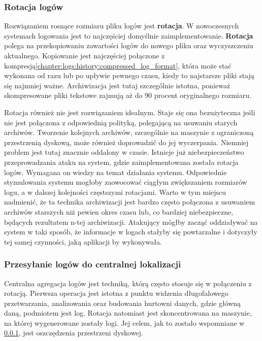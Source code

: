         \subsubsection{Rotacja logów}
        \label{chapter:logs:collecting:rotation}
        Rozwiązaniem rosnące rozmiaru pliku logów jest \textbf{rotacja}. W nowoczesnych systemach logowania
        jest to najczęściej domyślnie zaimplementowanie. \textbf{Rotacja} polega na przekopiowaniu 
        zawartości logów do nowego pliku oraz wyczyszczeniu aktualnego. Kopiowanie jest najczęściej połączone
        z kompresją\ref{chapter:logs:history:compressed_log_format}, która może stać wykonana od razu lub po upływie pewnego czasu, kiedy to najstarsze
        pliki stają się najmniej ważne. Archiwizacja jest tutaj szczególnie istotna, ponieważ
        skompresowane pliki tekstowe zajmują aż do 90 procent oryginalnego rozmiaru.
        
        Rotacja również nie jest rozwiązaniem idealnym. Staje się ona bezużyteczna jeśli nie jest połączona
        z odpowiednią polityką, polegającą na usuwaniu starych archiwów. Tworzenie kolejnych archiwów,
        szczególnie na maszynie z ograniczoną przestrzenią dyskową, może również doprowadzić do jej wyczerpania.
        Niemniej problem jest tutaj znacznie oddalony w czasie. Istnieje już niebezpieczeństwo przeprowadzania
        ataku na system, gdzie zaimplementowana została rotacja logów. Wymagana on wiedzy na temat działania systemu.
        Odpowiednie stymulowania systemu mogłoby zaowocować ciągłym zwiększaniem rozmiarów logu, a w dalszej kolejności
        częstszymi rotacjami. Warto w tym miejscu nadmienić, że ta technika archiwizacji jest bardzo często
        połączona z usuwaniem archiwów starszych niż pewien okres czasu lub, co bardziej niebezpieczne, będących
        rezultatem n-tej archiwizacji. Atakujący mógłby zacząć oddziaływać na system w taki sposób, że informacje
        w logach stałyby się powtarzalne i dotyczyły tej samej czynności, jaką aplikacji by wykonywała.
        
        \subsubsection{Przesyłanie logów do centralnej lokalizacji}
        \label{chapter:logs:collecting:central_location}
        Centralna agregacja logów jest techniką, którą często stosuje się w połączeniu z rotacją.
        Pierwsza operacja jest istotna z punktu widzenia długofalowego przetwarzania, analizowania oraz
        budowania hurtowni danych, gdzie główną daną, podmiotem jest log. Rotacja natomiast jest skoncentrowana
        na maszynie, na której wygenerowane zostały logi. Jej celem, jak to zostało wspomniane w \ref{chapter:logs:collecting:rotation},
        jest oszczędzenia przestrzeni dyskowej.
    